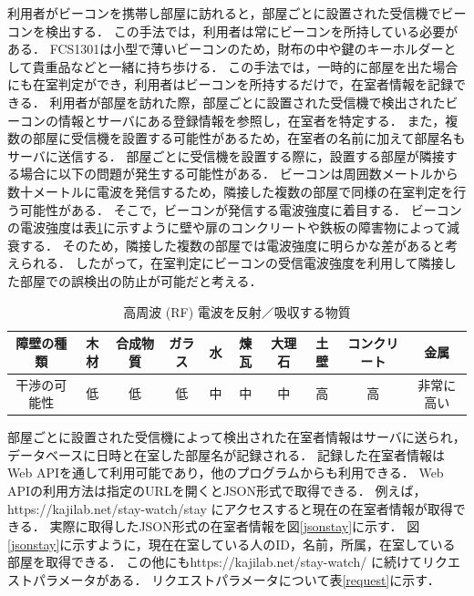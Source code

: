 
利用者がビーコンを携帯し部屋に訪れると，部屋ごとに設置された受信機でビーコンを検出する．
この手法では，利用者は常にビーコンを所持している必要がある．
FCS1301は小型で薄いビーコンのため，財布の中や鍵のキーホルダーとして貴重品などと一緒に持ち歩ける．
この手法では，一時的に部屋を出た場合にも在室判定ができ，利用者はビーコンを所持するだけで，在室者情報を記録できる．
利用者が部屋を訪れた際，部屋ごとに設置された受信機で検出されたビーコンの情報とサーバにある登録情報を参照し，在室者を特定する．
また，複数の部屋に受信機を設置する可能性があるため，在室者の名前に加えて部屋名もサーバに送信する．
部屋ごとに受信機を設置する際に，設置する部屋が隣接する場合に以下の問題が発生する可能性がある．
ビーコンは周囲数メートルから数十メートルに電波を発信するため，隣接した複数の部屋で同様の在室判定を行う可能性がある．
そこで，ビーコンが発信する電波強度に着目する．
ビーコンの電波強度は表\ref{tb:rf}に示すように壁や扉のコンクリートや鉄板の障害物によって減衰する\cite{barrier}．
そのため，隣接した複数の部屋では電波強度に明らかな差があると考えられる．
したがって，在室判定にビーコンの受信電波強度を利用して隣接した部屋での誤検出の防止が可能だと考える．

\begin{table}[H]
  \begin{center}
    \caption{高周波 (RF) 電波を反射／吸収する物質}
    \label{tb:rf}
    \begin{tabular}{|c||c|c|c|c|c|c|c|c|c|} \hline
      障壁の種類   & 木材 & 合成物質 & ガラス & 水 & 煉瓦 & 大理石 & 土壁 & コンクリート & 金属       \\ \hline
      干渉の可能性 & 低   & 低       & 低     & 中 & 中   & 中     & 高   & 高           & 非常に高い \\ \hline
    \end{tabular}
  \end{center}
\end{table}

部屋ごとに設置された受信機によって検出された在室者情報はサーバに送られ，データベースに日時と在室した部屋名が記録される．
記録した在室者情報はWeb APIを通して利用可能であり，他のプログラムからも利用できる．
Web APIの利用方法は指定のURLを開くとJSON形式\cite{json}で取得できる．
例えば，https://kajilab.net/stay-watch/stay にアクセスすると現在の在室者情報が取得できる．
実際に取得したJSON形式の在室者情報を図\ref{jsonstay}に示す．
図\ref{jsonstay}に示すように，現在在室している人のID，名前，所属，在室している部屋を取得できる．
この他にもhttps://kajilab.net/stay-watch/ に続けてリクエストパラメータがある．
リクエストパラメータについて表\ref{request}に示す．


